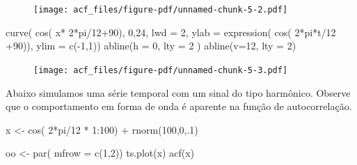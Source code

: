 \documentclass[
  letterpaper,
  DIV=11,
  numbers=noendperiod]{scrreprt}
\newenvironment{Shaded}{\begin{snugshade}}{\end{snugshade}}
\newcommand{\AttributeTok}[1]{\textcolor[rgb]{0.40,0.45,0.13}{#1}}
\newcommand{\DecValTok}[1]{\textcolor[rgb]{0.68,0.00,0.00}{#1}}
\newcommand{\FunctionTok}[1]{\textcolor[rgb]{0.28,0.35,0.67}{#1}}
\newcommand{\NormalTok}[1]{\textcolor[rgb]{0.00,0.23,0.31}{#1}}
\newcommand{\OtherTok}[1]{\textcolor[rgb]{0.00,0.23,0.31}{#1}}
\newcommand{\SpecialCharTok}[1]{\textcolor[rgb]{0.37,0.37,0.37}{#1}}
\begin{document}
\begin{figure}[H]

{\centering \texttt{[image: acf\_files/figure-pdf/unnamed-chunk-5-2.pdf]}

}

\end{figure}

\begin{Shaded}
\begin{Highlighting}[]
\FunctionTok{curve}\NormalTok{( }\FunctionTok{cos}\NormalTok{( x}\SpecialCharTok{*} \DecValTok{2}\SpecialCharTok{*}\NormalTok{pi}\SpecialCharTok{/}\DecValTok{12}\SpecialCharTok{+}\DecValTok{90}\NormalTok{), }\DecValTok{0}\NormalTok{,}\DecValTok{24}\NormalTok{, }\AttributeTok{lwd =} \DecValTok{2}\NormalTok{, }\AttributeTok{ylab =} \FunctionTok{expression}\NormalTok{( }\FunctionTok{cos}\NormalTok{( }\DecValTok{2}\SpecialCharTok{*}\NormalTok{pi}\SpecialCharTok{*}\NormalTok{t}\SpecialCharTok{/}\DecValTok{12} \SpecialCharTok{+}\DecValTok{90}\NormalTok{)), }\AttributeTok{ylim =} \FunctionTok{c}\NormalTok{(}\SpecialCharTok{{-}}\DecValTok{1}\NormalTok{,}\DecValTok{1}\NormalTok{))}
\FunctionTok{abline}\NormalTok{(}\AttributeTok{h =} \DecValTok{0}\NormalTok{, }\AttributeTok{lty =} \DecValTok{2}\NormalTok{ )}
\FunctionTok{abline}\NormalTok{(}\AttributeTok{v=}\DecValTok{12}\NormalTok{, }\AttributeTok{lty =} \DecValTok{2}\NormalTok{)}
\end{Highlighting}
\end{Shaded}

\begin{figure}[H]

{\centering \texttt{[image: acf\_files/figure-pdf/unnamed-chunk-5-3.pdf]}

}

\end{figure}

Abaixo simulamos uma série temporal com um sinal do tipo harmônico.
Observe que o comportamento em forma de onda é aparente na função de
autocorrelação.

\begin{Shaded}
\begin{Highlighting}[]
\NormalTok{x }\OtherTok{\textless{}{-}} \FunctionTok{cos}\NormalTok{( }\DecValTok{2}\SpecialCharTok{*}\NormalTok{pi}\SpecialCharTok{/}\DecValTok{12} \SpecialCharTok{*} \DecValTok{1}\SpecialCharTok{:}\DecValTok{100}\NormalTok{) }\SpecialCharTok{+} \FunctionTok{rnorm}\NormalTok{(}\DecValTok{100}\NormalTok{,}\DecValTok{0}\NormalTok{,.}\DecValTok{1}\NormalTok{)}

\NormalTok{oo }\OtherTok{\textless{}{-}} \FunctionTok{par}\NormalTok{( }\AttributeTok{mfrow =} \FunctionTok{c}\NormalTok{(}\DecValTok{1}\NormalTok{,}\DecValTok{2}\NormalTok{))}
\FunctionTok{ts.plot}\NormalTok{(x)}
\FunctionTok{acf}\NormalTok{(x)}
\end{Highlighting}
\end{Shaded}
\end{document}
